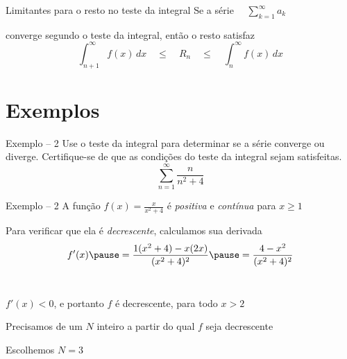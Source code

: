 \documentclass[fleqn,utf8,aspectratio=169,12pt]{beamer}
\begin{document}
\begin{frame}{Limitantes para o resto no teste da integral}
  Se a série
  \(
    \quad \sum_{k=1}^{\infty} a_k
  \)

  \vspace{0.5\baselineskip}
  converge segundo o teste da integral, então o resto satisfaz
  \[
    \int_{n+1}^{\infty} f(x)\,dx
    \quad\leq\quad
    R_n
    \quad\leq\quad
    \int_{n}^{\infty} f(x)\,dx
  \]
\end{frame}

\section{Exemplos}

\begin{frame}{Exemplo -- 2}
  Use o teste da integral para determinar se a série converge ou diverge.
  Certifique-se de que as condições do teste da integral sejam satisfeitas.
  \[
  \sum_{n=1}^{\infty} \frac{n}{n^2+4}
  \]
\end{frame}

\begin{frame}{Exemplo -- 2}
  A função \(f(x)=\frac{x}{x^2+4}\) é \emph{positiva} e \emph{contínua} para $x\geq 1$

  \pause
  \vspace{\baselineskip}
  Para verificar que ela é \emph{decrescente}, calculamos sua derivada
  \[
    f'(x)
    \pause
    = \frac{1(x^2+4) - x(2x)}{(x^2+4)^2}
    \pause
    = \frac{4-x^2}{(x^2+4)^2}
  \]
  ~

  \pause
  $f'(x)<0$, e portanto $f$ é decrescente, para todo $x>2$

  \pause
  \vspace{\baselineskip}
  Precisamos de um $N$ inteiro a partir do qual $f$ seja decrescente

  \pause
  \vspace{\baselineskip}
  Escolhemos $N=3$
\end{frame}
\end{document}
